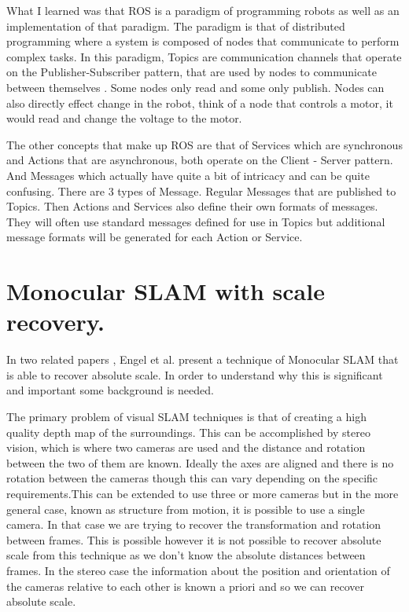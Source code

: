 \documentclass[]{../resources/final_report}
\begin{document}
What I learned was that ROS is a paradigm of programming robots as well as an implementation of that paradigm. The paradigm is that of distributed programming where a system is composed of nodes that communicate to perform complex tasks. In this paradigm, Topics are communication channels that operate on the Publisher-Subscriber pattern, that are used by nodes to communicate between themselves \cite{ros_topics_2019}. Some nodes only read and some only publish. Nodes can also directly effect change in the robot, think of a node that controls a motor, it would read and change the voltage to the motor.

The other concepts that make up ROS are that of Services \cite{ros_servicess_2019} which are synchronous and Actions that are asynchronous, both operate on the Client - Server pattern.  And Messages \cite{ros_messages_2016} which actually have quite a bit of intricacy and can be quite confusing. There are 3 types of Message. Regular Messages that are published to Topics. Then Actions and Services also define their own formats of messages. They will often use standard messages defined for use in Topics but additional message formats will be generated for each Action or Service.

\section{Monocular SLAM with scale recovery.}

In two related papers \cite{Engel:FigureFlying}\cite{Engel:Camera-basedNav}, Engel et al. present a technique of Monocular SLAM that is able to recover absolute scale. In order to understand why this is significant and important some background is needed.

The primary problem of visual SLAM techniques is that of creating a high quality depth map of the surroundings. This can be accomplished by stereo vision, which is where two cameras are used and the distance and rotation between the two of them are known. Ideally the axes are aligned and there is no rotation between the cameras though this can vary depending on the specific requirements.This can be extended to use three or more cameras but in the more general case, known as structure from motion, it is possible to use a single camera. In that case we are trying to recover the transformation and rotation between frames. This is possible however it is not possible to recover absolute scale from this technique as we don't know the absolute distances between frames. In the stereo case the information about the position and orientation of the cameras relative to each other is known a priori and so we can recover absolute scale.
\end{document}
